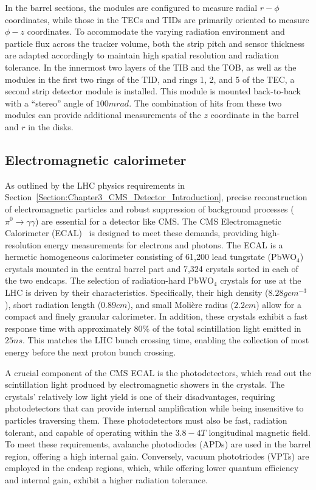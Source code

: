 In the barrel sections, the modules are configured to measure radial $r-\phi$ coordinates, while those in the TECs and TIDs are primarily oriented to measure $\phi-z$ coordinates. To accommodate the varying radiation environment and particle flux across the tracker volume, both the strip pitch and sensor thickness are adapted accordingly to maintain high spatial resolution and radiation tolerance. In the innermost two layers of the TIB and the TOB, as well as the modules in the first two rings of the TID, and rings 1, 2, and 5 of the TEC, a second strip detector module is installed. This module is mounted back-to-back with a ``stereo'' angle of $100\unit{mrad}$. The combination of hits from these two modules can provide additional measurements of the $z$ coordinate in the barrel and $r$ in the disks.

\subsection{Electromagnetic calorimeter}

As outlined by the LHC physics requirements in Section~\ref{Section:Chapter3_CMS_Detector_Introduction}, precise reconstruction of electromagnetic particles and robust suppression of background processes ($\pi^0 \to \gamma \gamma$) are essential for a detector like CMS.  The CMS Electromagnetic Calorimeter (ECAL)~\cite{LHC_CMS,CMS_Detector_Run3,CMS_ECAL_Performance_Run2} is designed to meet these demands, providing high-resolution energy measurements for electrons and photons. The ECAL is a hermetic homogeneous calorimeter consisting of 61,200 lead tungstate (PbWO$_4$) crystals mounted in the central barrel part and 7,324 crystals sorted in each of the two endcaps. The selection of radiation-hard PbWO$_4$ crystals for use at the LHC is driven by their characteristics. Specifically, their high density ($8.28\unit{gcm}^{-3}$), short radiation length ($0.89\unit{cm}$), and small Moli\`ere radius ($2.2\unit{cm}$) allow for a compact and finely granular calorimeter. In addition, these crystals exhibit a fast response time with approximately 80\% of the total scintillation light emitted in $25\unit{ns}$. This matches the LHC bunch crossing time, enabling the collection of most energy before the next proton bunch crossing.

A crucial component of the CMS ECAL is the photodetectors, which read out the scintillation light produced by electromagnetic showers in the crystals. The crystals’ relatively low light yield is one of their disadvantages, requiring photodetectors that can provide internal amplification while being insensitive to particles traversing them. These photodetectors must also be fast, radiation tolerant, and capable of operating within the $3.8-4\unit{T}$ longitudinal magnetic field. To meet these requirements, avalanche photodiodes (APDs) are used in the barrel region, offering a high internal gain. Conversely, vacuum phototriodes (VPTs) are employed in the endcap regions, which, while offering lower quantum efficiency and internal gain, exhibit a higher radiation tolerance.

